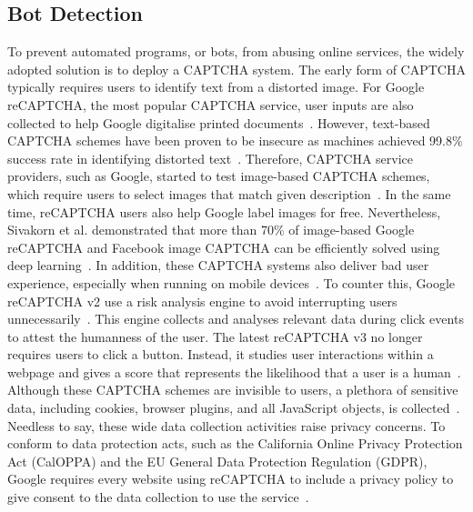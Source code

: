 \subsection{Bot Detection}

To prevent automated programs, or bots, from abusing online services, the widely adopted solution is to deploy a CAPTCHA system. The early form of CAPTCHA typically requires users to identify text from a distorted image. For Google reCAPTCHA, the most popular CAPTCHA service, user inputs are also collected to help Google digitalise printed documents~\cite{von2008recaptcha}. However, text-based CAPTCHA schemes have been proven to be insecure as machines achieved 99.8\% success rate in identifying distorted text~\cite{yan2008low,5395072,goodfellow2013multi}. Therefore, CAPTCHA service providers, such as Google, started to test image-based CAPTCHA schemes, which require users to select images that match given description~\cite{Shet2014}. In the same time, reCAPTCHA users also help Google label images for free. Nevertheless, Sivakorn et al. demonstrated that more than 70\% of image-based Google reCAPTCHA and Facebook image CAPTCHA can be efficiently solved using deep learning~\cite{sivakorn2016robot,Zhou:2018:BGR:3280489.3280510}. In addition, these CAPTCHA systems also deliver bad user experience, especially when running on mobile devices~\cite{reynaga2013usability}. To counter this, Google reCAPTCHA v2 use a risk analysis engine to avoid interrupting users unnecessarily~\cite{Google2019}. This engine collects and analyses relevant data during click events to attest the humanness of the user. The latest reCAPTCHA v3 no longer requires users to click a button. Instead, it studies user interactions within a webpage and gives a score that represents the likelihood that a user is a human~\cite{Google2018}. Although these CAPTCHA schemes are invisible to users, a plethora of sensitive data, including cookies, browser plugins, and all JavaScript objects, is collected~\cite{LaraOReilly2015}. Needless to say, these wide data collection activities raise privacy concerns. To conform to data protection acts, such as the California Online Privacy Protection Act (CalOPPA) and the EU General Data Protection Regulation (GDPR), Google requires every website using reCAPTCHA to include a privacy policy to give consent to the data collection to use the service~\cite{Pegarella2018}.